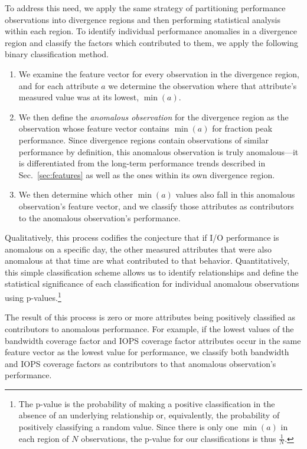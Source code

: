 To address this need, we apply the same strategy of partitioning performance observations into divergence regions and then performing statistical analysis within each region.
To identify individual performance anomalies in a divergence region and classify the factors which contributed to them, we apply the following binary classification method.

\begin{enumerate}[leftmargin=*]

\item We examine the feature vector for every observation in the divergence region, and for each attribute $a$ we determine the observation where that attribute's measured value was at its lowest, $\min(a)$.

\item We then define the \emph{anomalous observation} for the divergence region as the observation whose feature vector contains $\min(a)$ for fraction peak performance.
Since divergence regions contain observations of similar performance by definition, this anomalous observation is truly anomalous---it is differentiated from the long-term performance trends described in Sec.~\ref{sec:features} as well as the ones within its own divergence region.

\item We then determine which other $\min(a)$ values also fall in this anomalous observation's feature vector, and we classify those attributes as contributors to the anomalous observation's performance.

\end{enumerate}

Qualitatively, this process codifies the conjecture that if I/O performance is anomalous on a specific day, the other measured attributes that were also anomalous at that time are what contributed to that behavior.
Quantitatively, this simple classification scheme allows us to identify relationships and define the statistical significance of each classification for individual anomalous observations using p-values.\footnote{
The p-value is the probability of making a positive classification in the absence of an underlying relationship or, equivalently, the probability of positively classifying a random value.
Since there is only one $\min(a)$ in each region of $N$ observations, the p-value for our classifications is thus $\frac{1}{N}.$}

The result of this process is zero or more attributes being positively classified as contributors to anomalous performance.
For example, if the lowest values of the bandwidth coverage factor and IOPS coverage factor attributes occur in the same feature vector as the lowest value for performance, we classify both bandwidth and IOPS coverage factors as contributors to that anomalous observation's performance.

